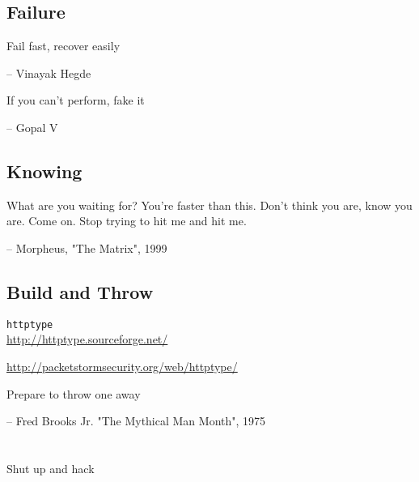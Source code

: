 \documentclass{beamer}
\begin{document}
\subsection{Failure}

\begin{frame}{}
\begin{center}Fail fast, recover easily\end{center}

\hfill \tiny{-- Vinayak Hegde}
\end{frame}


\begin{frame}{}
\begin{center}If you can't perform, fake it\end{center}

\hfill \tiny{-- Gopal V}
\end{frame}


\subsection{Knowing}

\begin{frame}{}
\small{What are you waiting for? You're faster than this. Don't think you are, know you are. Come on. Stop trying to hit me and hit me.}

\hfill \tiny{-- Morpheus, "The Matrix", 1999}
\end{frame}

\subsection{Build and Throw}

\begin{frame}{}
\begin{center}
\texttt{httptype} \\ \href{http://httptype.sourceforge.net/}{\tiny{http://httptype.sourceforge.net/}}
\end{center}
\end{frame}

\begin{frame}{}
\begin{center}
\href{http://packetstormsecurity.org/web/httptype/}{http://packetstormsecurity.org/web/httptype/}
\end{center}
\end{frame}


\begin{frame}{}
Prepare to throw one away

\hfill \tiny{-- Fred Brooks Jr. "The Mythical Man Month", 1975}
\end{frame}


\section{}

\begin{frame}{}
\begin{center}
Shut up and hack
\end{center}
\end{frame}
\end{document}
